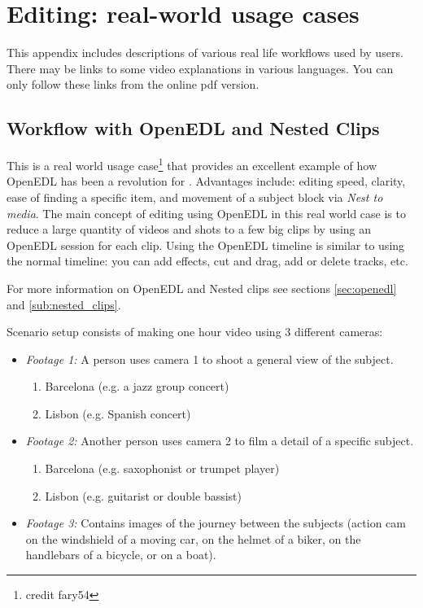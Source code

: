 \chapter{Editing: real-world usage cases}%
\label{cha:editing_real_world_usage}

This appendix includes descriptions of various real life workflows used by \CGG{} users. There may be links to some video explanations in various languages.
You can only follow these links from the online pdf version.

\section{Workflow with OpenEDL and Nested Clips}%
\label{sec:workflow_openedl_nested_clips}

This is a real world usage case\protect\footnote{credit fary54} that provides an excellent example of how OpenEDL has been a
revolution for \CGG{}. Advantages include: editing speed, clarity, ease of finding a specific item,
and movement of a subject block via \textit{Nest to media}.
The main concept of editing using OpenEDL in this real world case is to
reduce a large quantity of videos and shots to a few big clips by using
an OpenEDL session for each clip. Using the OpenEDL timeline is similar to
 using the normal timeline: you can add effects, cut and drag, add or delete
tracks, etc.

For more information on OpenEDL and Nested clips see sections \ref{sec:openedl} and \ref{sub:nested_clips}.

Scenario setup consists of making one hour video using 3 different cameras:

\begin{itemize}
	\item \textit{Footage 1:} A person uses camera 1 to shoot a general view of the subject.
	\begin{enumerate}
		\item[a)] Barcelona (e.g. a jazz group concert)
		\item[b)] Lisbon (e.g. Spanish concert)
	\end{enumerate}
	\item \textit{Footage 2:} Another person uses camera 2 to film a detail of a specific subject.
	\begin{enumerate}
		\item[a)] Barcelona (e.g. saxophonist or trumpet player)
		\item[b)] Lisbon (e.g. guitarist or double bassist)
	\end{enumerate}
	\item \textit{Footage 3:} Contains images of the journey between the subjects (action cam on the windshield of a moving car, on the helmet of a biker, on the handlebars of a bicycle, or on a boat).
\end{itemize}

